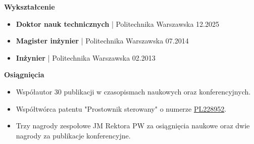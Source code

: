 \documentclass[10pt,A4]{article}
\newcommand{\cvsection}[1]
{
	\begin{center}
		\large\textcolor{sectcol}{\textbf{#1}}
	\end{center}
}
\newcommand{\cvevent}[4]
{

\begin{tabular*}{1\textwidth}{p{13.6cm}  x{3.9cm}}
	\textbf{#2} - \textcolor{bgcol}{#3} &   \vspace{2.5pt}\textcolor{sectcol}{#1}
\end{tabular*}

\vspace{-8pt}
\textcolor{black}{\hrule}
\vspace{6pt}

	\foreach \desc in {#4}{
		$\bullet$ \desc\\[3pt]
	}
	
\vspace{3pt}
}
\begin{document}
\cvsection{Wykształcenie}
\begin{itemize}[label=$\bullet$, nolistsep, leftmargin=*]
	\item \textbf{Doktor nauk technicznych} | Politechnika Warszawska \hfill 12.2025
	\item \textbf{Magister inżynier} | Politechnika Warszawska \hfill 07.2014
	\item \textbf{Inżynier} | Politechnika Warszawska \hfill 02.2013
\end{itemize}

\cvsection{Osiągnięcia}
\begin{itemize}[label=$\bullet$, nolistsep, leftmargin=*]
	\item Współautor 30 publikacji w czasopismach naukowych oraz konferencyjnych.
	\item Współtwórca patentu "Prostownik sterowany" o numerze \href{https://worldwide.espacenet.com/patent/search/family/059897515/publication/PL228952B1?q=pn\%3DPL228952B1}{PL228952}.
	\item Trzy nagrody zespołowe JM Rektora PW za osiągnięcia naukowe oraz dwie nagrody za publikacje konferencyjne.
\end{itemize}





\end{document}
